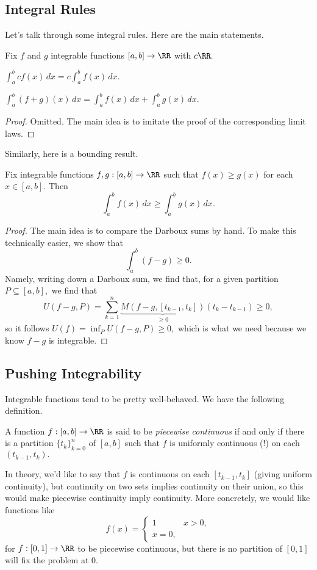 \documentclass[../notes.tex]{subfiles}
\begin{document}
\subsection{Integral Rules}
Let's talk through some integral rules. Here are the main statements.
\begin{proposition}
	Fix $f$ and $g$ integrable functions $[a,b]\to\RR$ with $c\RR.$
	\begin{listalph}
		\item $\int_a^bcf(x)\,dx=c\int_a^bf(x)\,dx.$
		\item $\int_a^b(f+g)(x)\,dx=\int_a^bf(x)\,dx+\int_a^bg(x)\,dx.$
	\end{listalph}
\end{proposition}
\begin{proof}
	Omitted. The main idea is to imitate the proof of the corresponding limit laws.
\end{proof}
Similarly, here is a bounding result.
\begin{proposition}
	Fix integrable functions $f,g:[a,b]\to\RR$ such that $f(x)\ge g(x)$ for each $x\in[a,b].$ Then
	\[\int_a^bf(x)\,dx\ge\int_a^bg(x)\,dx.\]
\end{proposition}
\begin{proof}
	The main idea is to compare the Darboux sums by hand. To make this technically easier, we show that
	\[\int_a^b(f-g)\ge0.\]
	Namely, writing down a Darboux sum, we find that, for a given partition $P\subseteq[a,b],$ we find that
	\[U(f-g,P)=\sum_{k=1}^n\underbrace{M(f-g,[t_{k-1},t_k])}_{\ge0}(t_k-t_{k-1})\ge0,\]
	so it follows $U(f)=\inf_PU(f-g,P)\ge0,$ which is what we need because we know $f-g$ is integrable.
\end{proof}

\subsection{Pushing Integrability}
Integrable functions tend to be pretty well-behaved. We have the following definition.
\begin{definition}
	A function $f:[a,b]\to\RR$ is said to be \textit{piecewise continuous} if and only if there is a partition $\{t_k\}_{k=0}^n$ of $[a,b]$ such that $f$ is uniformly continuous (!) on each $(t_{k-1},t_k).$
\end{definition}
In theory, we'd like to say that $f$ is continuous on each $[t_{k-1},t_k]$ (giving uniform continuity), but continuity on two sets implies continuity on their union, so this would make piecewise continuity imply continuity. More concretely, we would like functions like
\[f(x)=\begin{cases}
	1 & x > 0, \\
	x = 0,
\end{cases}\]
for $f:[0,1]\to\RR$ to be piecewise continuous, but there is no partition of $[0,1]$ will fix the problem at $0.$
\end{document}
